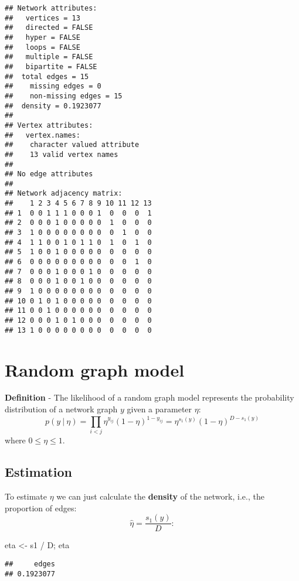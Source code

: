 \documentclass[]{book}
\newenvironment{Shaded}{\begin{snugshade}}{\end{snugshade}}
\newcommand{\StringTok}[1]{\textcolor[rgb]{0.31,0.60,0.02}{{#1}}}
\newcommand{\NormalTok}[1]{{#1}}
\begin{document}
\begin{verbatim}
## Network attributes:
##   vertices = 13
##   directed = FALSE
##   hyper = FALSE
##   loops = FALSE
##   multiple = FALSE
##   bipartite = FALSE
##  total edges = 15 
##    missing edges = 0 
##    non-missing edges = 15 
##  density = 0.1923077 
## 
## Vertex attributes:
##   vertex.names:
##    character valued attribute
##    13 valid vertex names
## 
## No edge attributes
## 
## Network adjacency matrix:
##    1 2 3 4 5 6 7 8 9 10 11 12 13
## 1  0 0 1 1 1 0 0 0 1  0  0  0  1
## 2  0 0 0 1 0 0 0 0 0  1  0  0  0
## 3  1 0 0 0 0 0 0 0 0  0  1  0  0
## 4  1 1 0 0 1 0 1 1 0  1  0  1  0
## 5  1 0 0 1 0 0 0 0 0  0  0  0  0
## 6  0 0 0 0 0 0 0 0 0  0  0  1  0
## 7  0 0 0 1 0 0 0 1 0  0  0  0  0
## 8  0 0 0 1 0 0 1 0 0  0  0  0  0
## 9  1 0 0 0 0 0 0 0 0  0  0  0  0
## 10 0 1 0 1 0 0 0 0 0  0  0  0  0
## 11 0 0 1 0 0 0 0 0 0  0  0  0  0
## 12 0 0 0 1 0 1 0 0 0  0  0  0  0
## 13 1 0 0 0 0 0 0 0 0  0  0  0  0
\end{verbatim}

\section{Random graph model}\label{random-graph-model}

\textbf{Definition} - The likelihood of a random graph model represents
the probability distribution of a network graph \(y\) given a parameter
\(\eta\): \[
p(y\ |\ \eta) = \prod_{i < j} \eta^{y_{ij}}(1-\eta)^{1-y_{ij}} = \eta^{s_1(y)}(1 - \eta)^{D - s_1(y)}
\] where \(0 \le \eta \le 1\).

\subsection{Estimation}\label{estimation}

To estimate \(\eta\) we can just calculate the \textbf{density} of the
network, i.e., the proportion of edges: \[
\hat{\eta} = \frac{s_1(y)}{D}: 
\]

\begin{Shaded}
\begin{Highlighting}[]
\NormalTok{eta <-}\StringTok{ }\NormalTok{s1 /}\StringTok{ }\NormalTok{D; eta}
\end{Highlighting}
\end{Shaded}

\begin{verbatim}
##     edges 
## 0.1923077
\end{verbatim}
\end{document}

